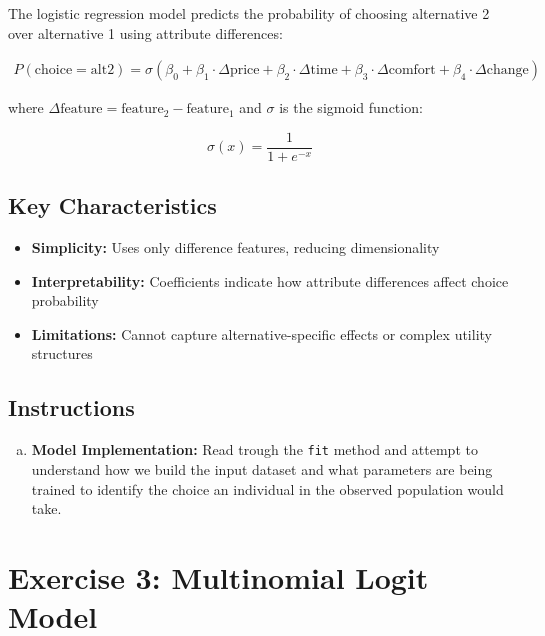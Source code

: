 \documentclass[11pt]{article}
\begin{document}
The logistic regression model predicts the probability of choosing alternative 2 over alternative 1 using attribute differences:

\begin{align}
P(\text{choice} = \text{alt2}) = \sigma(\beta_0 + \beta_1 \cdot \Delta\text{price} + \beta_2 \cdot \Delta\text{time} + \beta_3 \cdot \Delta\text{comfort} + \beta_4 \cdot \Delta\text{change})
\end{align}

\noindent where $\Delta\text{feature} = \text{feature}_2 - \text{feature}_1$ and $\sigma$ is the sigmoid function:

\begin{equation}
\sigma(x) = \frac{1}{1 + e^{-x}}
\end{equation}

\subsection*{Key Characteristics}

\begin{itemize}
\item \textbf{Simplicity:} Uses only difference features, reducing dimensionality
\item \textbf{Interpretability:} Coefficients indicate how attribute differences affect choice probability
\item \textbf{Limitations:} Cannot capture alternative-specific effects or complex utility structures
\end{itemize}

\subsection*{Instructions}

\begin{enumerate}[(a)]
\item \textbf{Model Implementation:} Read trough the \verb|fit| method and attempt to understand how we build the input dataset and what parameters are being trained to identify the choice an individual in the observed population would take.
\end{enumerate}

\section*{Exercise 3: Multinomial Logit Model}

\begin{center}
\end{center}
\end{document}
